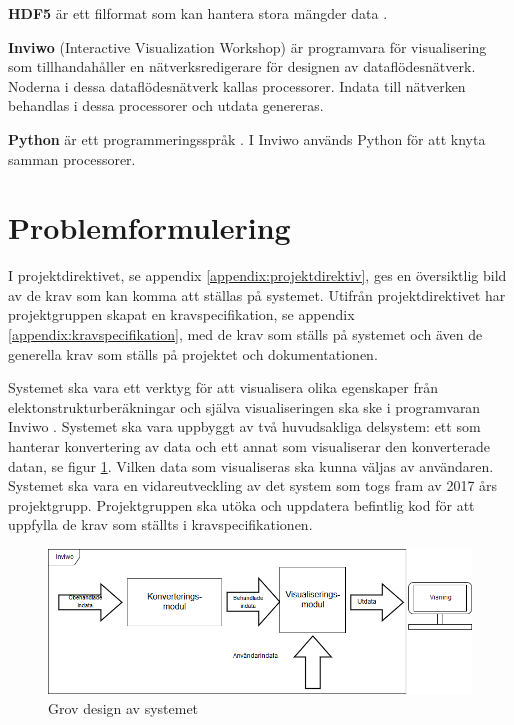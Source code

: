 \documentclass[a4paper,12pt,twoside,openright]{report}
\begin{document}
\textbf{HDF5} är ett filformat som kan hantera stora mängder data
\cite{hdf5}.

\textbf{Inviwo} (Interactive Visualization Workshop) är programvara
för visualisering som tillhandahåller en nätverksredigerare för
designen av dataflödesnätverk. Noderna i dessa dataflödesnätverk
kallas processorer. Indata till nätverken behandlas i dessa
processorer och utdata genereras.
\cite{Inviwo}

\textbf{Python} är ett programmeringsspråk \cite{Python}. I Inviwo används Python för att knyta samman processorer.


\section{Problemformulering}
\label{ch:problemformulering}

I projektdirektivet, se appendix \ref{appendix:projektdirektiv}, ges en översiktlig bild av de krav som kan komma att ställas på systemet. Utifrån projektdirektivet har projektgruppen skapat en kravspecifikation, se appendix \ref{appendix:kravspecifikation}, med de krav som ställs på systemet och även de generella krav som ställs på projektet och dokumentationen.

Systemet ska vara ett verktyg för att visualisera olika egenskaper från elektonstrukturberäkningar och själva visualiseringen ska ske i programvaran Inviwo \cite{Inviwo}.
Systemet ska vara uppbyggt av två huvudsakliga delsystem: ett som hanterar konvertering av data och ett annat som visualiserar den konverterade datan, se figur \ref{fig:grov-skiss}. Vilken data som visualiseras ska kunna väljas av användaren. Systemet ska vara en vidareutveckling av det system som togs fram av 2017 års projektgrupp. Projektgruppen ska utöka och uppdatera befintlig kod för att uppfylla de krav som ställts i kravspecifikationen.

\begin{figure}[H]
	\centering
	\includegraphics[scale=0.55]{grov-skiss.png}
	\caption{Grov design av systemet}
	\label{fig:grov-skiss}
\end{figure}
\end{document}
